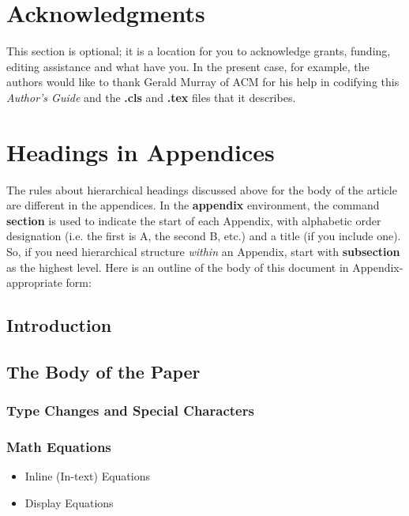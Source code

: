 \documentclass{acm_proc_article-sp}
\begin{document}
\section{Acknowledgments}
\label{sec-5}

This section is optional; it is a location for you
to acknowledge grants, funding, editing assistance and
what have you.  In the present case, for example, the
authors would like to thank Gerald Murray of ACM for
his help in codifying this \emph{Author's Guide}
and the \textbf{.cls} and \textbf{.tex} files that it describes.



  

\appendix
\section{Headings in Appendices}
\label{sec-6}

The rules about hierarchical headings discussed above for the body of
the article are different in the appendices.  In the \textbf{appendix}
environment, the command \textbf{section} is used to indicate the start of
each Appendix, with alphabetic order designation (i.e. the first is A,
the second B, etc.) and a title (if you include one).  So, if you need
hierarchical structure \emph{within} an Appendix, start with \textbf{subsection}
as the highest level. Here is an outline of the body of this document
in Appendix-appropriate form:
\subsection{Introduction}
\label{sec-6-1}
\subsection{The Body of the Paper}
\label{sec-6-2}
\subsubsection{Type Changes and Special Characters}
\label{sec-6-2-1}
\subsubsection{Math Equations}
\label{sec-6-2-2}
\begin{itemize}

\item Inline (In-text) Equations
\label{sec-6-2-2-1}%

\item Display Equations
\label{sec-6-2-2-2}%
\end{itemize} %
\end{document}
